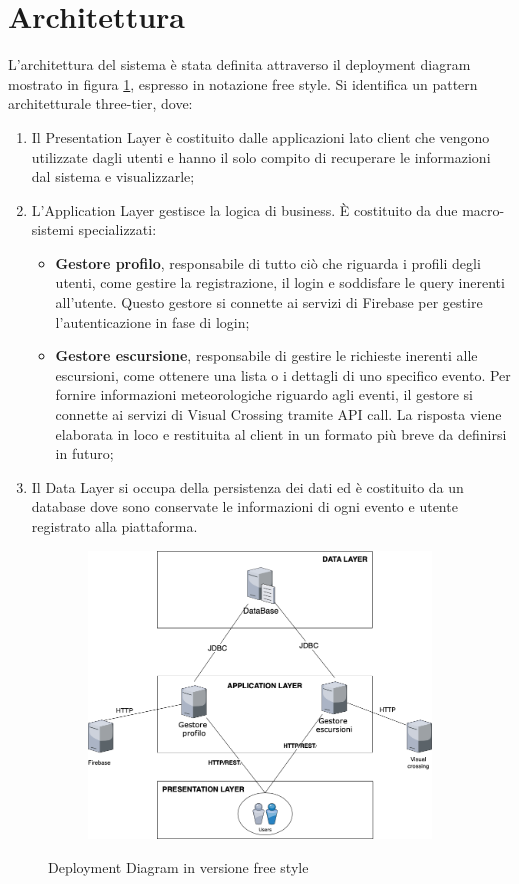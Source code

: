 \section{Architettura}

L'architettura del sistema è stata definita attraverso il deployment diagram mostrato in figura \ref{fig: DeployementFreeStyle}, espresso in notazione free style.
Si identifica un pattern architetturale three-tier, dove:
\begin{enumerate}
\item Il Presentation Layer è costituito dalle applicazioni lato client che vengono utilizzate dagli utenti e hanno il solo compito di recuperare le informazioni dal sistema e visualizzarle;
\item L'Application Layer gestisce la logica di business. È costituito da due macro-sistemi specializzati:
\begin{itemize}
    \item \textbf{Gestore profilo}, responsabile di tutto ciò che riguarda i profili degli utenti, come gestire la registrazione, il login
    e soddisfare le query inerenti all'utente. Questo gestore si connette ai servizi di Firebase per gestire l'autenticazione in fase di login;
    \item \textbf{Gestore escursione}, responsabile di gestire le richieste inerenti alle escursioni, come ottenere una lista o i dettagli di uno specifico
    evento. Per fornire informazioni meteorologiche riguardo agli eventi, il gestore si connette ai servizi di Visual Crossing tramite API call. La risposta viene elaborata
    in loco e restituita al client in un formato più breve da definirsi in futuro;
\end{itemize}
\item Il Data Layer si occupa della persistenza dei dati ed è costituito da un database dove sono conservate le informazioni di ogni evento e utente registrato alla 
piattaforma.
\end{enumerate}

\begin{figure}[ht!]
    \centering
    \begin{subfigure}{0.9\textwidth}
        \includegraphics[width=\linewidth]{immagini/DeployementFreeStyle.png}
    \end{subfigure}
    \caption{Deployment Diagram in versione free style}
    \label{fig: DeployementFreeStyle}
\end{figure}
